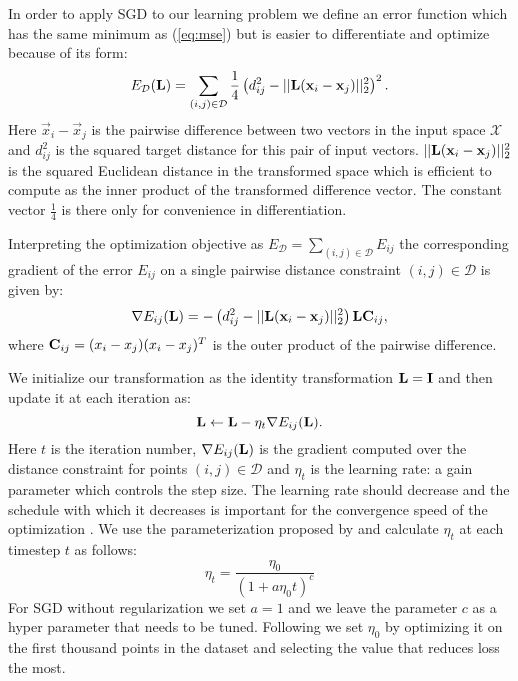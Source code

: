 In order to apply \ac{SGD} to our learning problem we define an error function which has the same minimum as (\ref{eq:mse}) but is easier to differentiate and optimize because of its form:
\begin{equation}
E_{\mathcal{D}}(\mathbf{L}) =  \sum_{(i,j) \in \mathcal{D}}  \frac{1}{4} \left ( d_{ij}^2 - ||\mathbf{L}(\mathbf{x}_i - \mathbf{x}_j)||_2^2 \right )^2.
\label{eq:opt_target}
\end{equation}
Here $\vec{x}_i - \vec{x}_j$ is the pairwise difference between two vectors in the input space $\mathcal{X}$ and $d_{ij}^2$ is the squared target distance for this pair of input vectors. $||\mathbf{L}(\mathbf{x}_i - \mathbf{x}_j)||_2^2$ is the squared Euclidean distance in the transformed space which is efficient to compute as the inner product of the transformed difference vector. The constant vector $\frac{1}{4}$ is there only for convenience in differentiation. 

Interpreting the optimization objective as $E_{\mathcal{D}} = \sum_{(i,j)\in\mathcal{D}} E_{ij}$ the corresponding gradient of the error $E_{ij}$ on a single pairwise distance constraint $(i,j) \in \mathcal{D}$ is given by:
\begin{equation}
\nabla E_{ij}(\mathbf{L})  = - \left ( d_{ij}^2 - ||\mathbf{L}(\mathbf{x}_i - \mathbf{x}_j)||_2^2 \right) \mathbf{L} \mathbf{C}_{ij},
\label{eq:opt_grad}
\end{equation}
where $\mathbf{C}_{ij} = (x_i - x_j)(x_i - x_j)^T$ is the outer product of the pairwise difference.

We initialize our transformation as the identity transformation $\mathbf{L} = \mathbf{I}$ and then update it at each iteration as:
\begin{equation}
\mathbf{L} \leftarrow \mathbf{L} - \eta_{t} \nabla E_{ij}(\mathbf{L}).
\label{eq:update}
\end{equation}
Here $t$ is the iteration number, $\nabla E_{ij}(\mathbf{L})$ is the gradient computed over the distance constraint for points $(i,j) \in \mathcal{D}$ and $\eta_{t}$ is the learning rate: a gain parameter which controls the step size. The learning rate should decrease and the schedule with which it decreases is important for the convergence speed of the optimization \cite{xu2011towards}. We use the parameterization proposed by \cite{xu2011towards} and calculate $\eta_{t}$ at each timestep $t$ as follows:
\begin{equation}
\eta_{t} = \frac{\eta_0}{\left(1+ a \eta_0 t \right)^c}
\label{eq:eta_update}
\end{equation}
For SGD without regularization we set $a = 1$ and we leave the parameter $c$ as a hyper parameter that needs to be tuned. Following \cite{bottou2008tradeoffs} we set $\eta_0$ by optimizing it on the first thousand points in the dataset and selecting the value that reduces loss the most.

